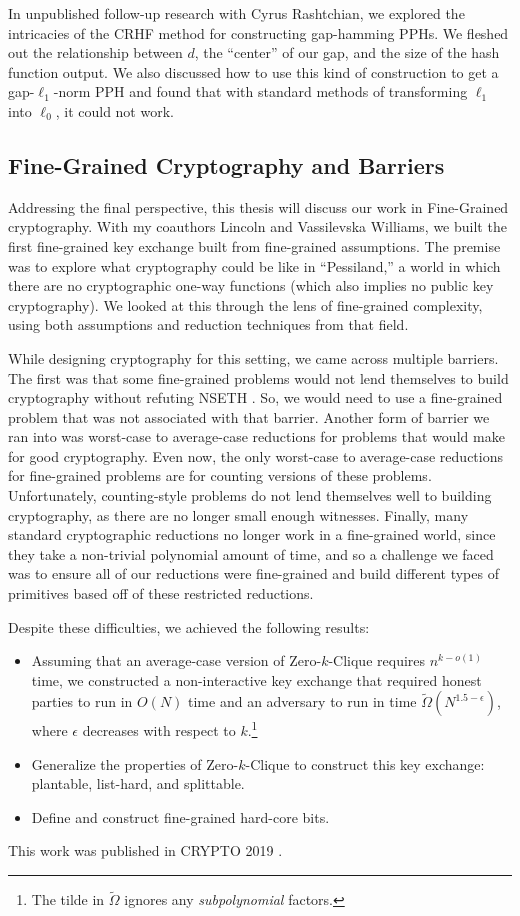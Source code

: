 In unpublished follow-up research with Cyrus Rashtchian, we explored the intricacies of the CRHF method for constructing gap-hamming PPHs. We fleshed out the relationship between $d$, the ``center'' of our gap, and the size of the hash function output. We also discussed how to use this kind of construction to get a gap-$\ell_1$-norm PPH and found that with standard methods of transforming $\ell_1$ into $\ell_0$, it could not work. %

\subsection{Fine-Grained Cryptography and Barriers}
Addressing the final perspective, this thesis will discuss our work in Fine-Grained cryptography. With my coauthors Lincoln and Vassilevska Williams, we built the first fine-grained key exchange built from fine-grained assumptions. The premise was to explore what cryptography could be like in ``Pessiland,'' a world in which there are no cryptographic one-way functions (which also implies no public key cryptography). We looked at this through the lens of fine-grained complexity, using both assumptions and reduction techniques from that field.

While designing cryptography for this setting, we came across multiple barriers. The first was that some fine-grained problems would not lend themselves to build cryptography without refuting NSETH \cite{CarmosinoGIMPS16}. So, we would need to use a fine-grained problem that was not associated with that barrier. Another form of barrier we ran into was worst-case to average-case reductions for problems that would make for good cryptography. Even now, the only worst-case to average-case reductions for fine-grained problems are for counting versions of these problems. Unfortunately, counting-style problems do not lend themselves well to building cryptography, as there are no longer small enough witnesses. Finally, many standard cryptographic reductions no longer work in a fine-grained world, since they take a non-trivial polynomial amount of time, and so a challenge we faced was to ensure all of our reductions were fine-grained and build different types of primitives based off of these restricted reductions.

Despite these difficulties, we achieved the following results:
\begin{itemize}
	\item Assuming that an average-case version of Zero-$k$-Clique requires $n^{k - o(1)}$ time, we constructed a non-interactive key exchange that required honest parties to run in $O(N)$ time and an adversary to run in time $\tilde\Omega(N^{1.5 - \epsilon})$, where $\epsilon$ decreases with respect to $k$.\footnote{The tilde in $\tilde \Omega$ ignores any \emph{subpolynomial} factors.}
	\item Generalize the properties of Zero-$k$-Clique to construct this key exchange: plantable, list-hard, and splittable.
	\item Define and construct fine-grained hard-core bits.
\end{itemize}
This work was published in CRYPTO 2019 \cite{LLVW19}.

